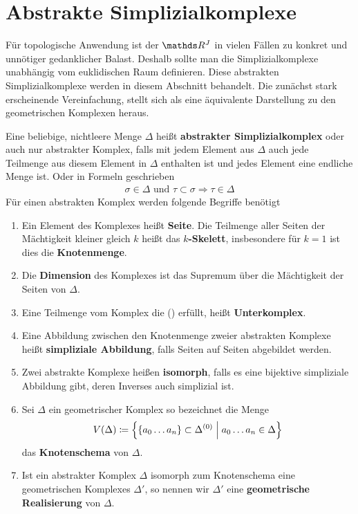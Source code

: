 
\section{Abstrakte Simplizialkomplexe}

Für topologische Anwendung ist der $\R^J$ in vielen Fällen zu konkret
und unnötiger gedanklicher Balast. Deshalb sollte man die
Simplizialkomplexe unabhängig vom euklidischen Raum definieren. Diese
abstrakten Simplizialkomplexe werden in diesem Abschnitt
behandelt. Die zunächst stark erscheinende Vereinfachung, stellt sich
als eine äquivalente Darstellung zu den geometrischen Komplexen
heraus.

\begin{Def}
  Eine beliebige, nichtleere Menge $\Delta$ heißt \textbf{abstrakter
    Simplizialkomplex} oder auch nur abstrakter Komplex, falls mit
  jedem Element aus $\Delta$ auch jede Teilmenge aus diesem Element in
  $\Delta$ enthalten ist und jedes Element eine endliche
  Menge ist. Oder in Formeln geschrieben
\renewcommand*{\theequation}{\textbullet}
  \begin{gather}
    \sigma \in \Delta \text{ und }  \tau \subset \sigma
    \Rightarrow \tau \in \Delta
  \end{gather}
  Für einen abstrakten Komplex werden folgende Begriffe benötigt
  \begin{enumerate}[({A}1)]
  \item Ein Element des Komplexes heißt \textbf{Seite}. Die Teilmenge aller
    Seiten der Mächtigkeit kleiner gleich $k$ heißt das \textbf{$k$-Skelett},
    insbesondere für $k=1$ ist dies die \textbf{Knotenmenge}.
  \item Die \textbf{Dimension} des Komplexes ist das Supremum über die
    Mächtigkeit der Seiten von $\Delta$.
  \item Eine Teilmenge vom Komplex die (\textbullet) erfüllt, heißt
    \textbf{Unterkomplex}.
  \item Eine Abbildung zwischen den Knotenmenge zweier abstrakten
    Komplexe heißt \textbf{simpliziale Abbildung}, falls Seiten auf
    Seiten abgebildet werden.
  \item Zwei abstrakte Komplexe heißen \textbf{isomorph}, falls es eine
    bijektive simpliziale Abbildung gibt, deren Inverses auch
    simplizial ist.
  \item Sei $\Delta$ ein geometrischer Komplex so bezeichnet die Menge
    \begin{gather*}
      V(\Delta) \coloneqq \left\{  \left\{ a_0 \ldots a_n \right\} \subset
        \Delta^{(0)}  \; \Big| \;  a_0 \ldots a_n \in \Delta \right\}
    \end{gather*}
    das \textbf{Knotenschema} von $\Delta$.
  \item Ist ein abstrakter Komplex $\Delta$ isomorph zum Knotenschema
    eine geometrischen Komplexes $\Delta'$, so nennen wir $\Delta'$
    eine \textbf{geometrische Realisierung} von $\Delta$.
  \end{enumerate}
\end{Def}

